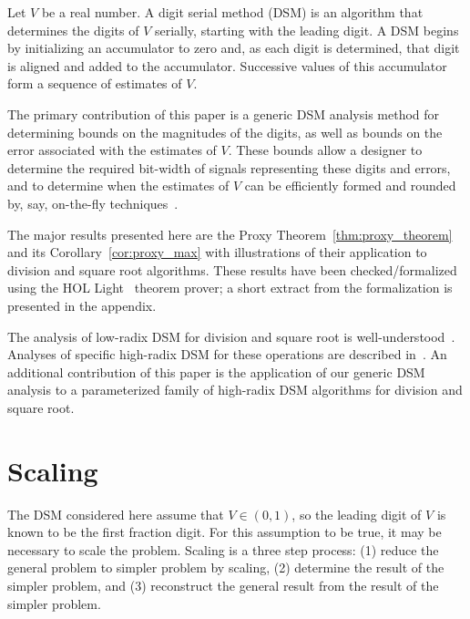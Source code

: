 \documentclass[10pt]{article}
\theoremstyle{definition}
\theoremstyle{remark}
\numberwithin{equation}{section}
\begin{document}
Let $V$ be a real number. 
A digit serial method (DSM) is an algorithm that determines the digits of $V$ serially, starting with the leading digit. 
A DSM begins by initializing an accumulator to zero and, as each digit is determined, that digit is aligned and added to the accumulator.
Successive values of this accumulator form a sequence of estimates of $V$.

The primary contribution of this paper is a generic DSM analysis method for determining bounds on the magnitudes of the digits, as well as bounds on the error associated with the estimates of $V$.
These bounds allow a designer to determine the required bit-width of signals representing these digits and errors, and to determine when the estimates of $V$ can be efficiently formed and rounded by, say, on-the-fly techniques~\cite{ercegovac1987fly, ercegovac1989fly}.

The major results presented here are the Proxy Theorem~\ref{thm:proxy_theorem} and its Corollary~\ref{cor:proxy_max} with illustrations of their application to division and square root algorithms. 
These results have been checked/formalized using the {HOL Light}~\cite{harrison1996hol} theorem prover; a short extract from the formalization is presented in the appendix.

The analysis of low-radix DSM for division and square root is well-understood~\cite{ercegovac1994division}. 
Analyses of specific high-radix DSM for these operations are described in~\cite{briggs199317, ercegovac1994very, lang1995very}. 
An additional contribution of this paper is the application of our generic DSM analysis to a parameterized family of high-radix DSM algorithms for division and square root.

\section{Scaling\label{sec:scaling}}

The DSM considered here assume that $V \in (0,1)$, so the leading digit of $V$ is known to be the first fraction digit. 
For this assumption to be true, it may be necessary to scale the problem. 
Scaling is a three step process: (1) reduce the general problem to simpler problem by scaling, (2) determine the result of the simpler problem, and (3) reconstruct the general result from the result of the simpler problem. 
\end{document}
